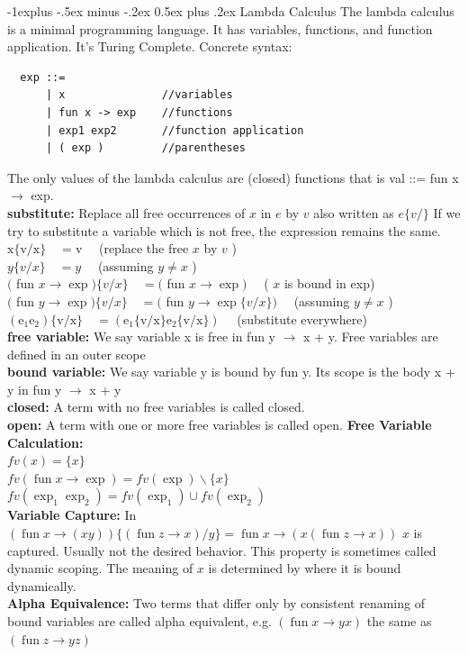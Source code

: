 \documentclass[10pt,landscape]{article}
\makeatletter
\renewcommand{\subsection}{\@startsection{subsection}{2}{0mm}%
                                {-1explus -.5ex minus -.2ex}%
                                {0.5ex plus .2ex}%
                                {\normalfont\normalsize\bfseries}}
\makeatother
\begin{document}
\begin{multicols}{3}
\subsection{Lambda Calculus}
The lambda calculus is a minimal programming language. It has variables, functions, and function application.
It's Turing Complete. Concrete syntax:
\begin{verbatim}
  exp ::=
      | x               //variables
      | fun x -> exp    //functions
      | exp1 exp2       //function application
      | ( exp )         //parentheses
\end{verbatim}
The only values of the lambda calculus are (closed) functions that is val ::= fun x $\rightarrow$ exp.\\
\textbf{substitute:} Replace all free occurrences of $x$ in $e$ by $v$ also written as $e\{v/\}$ If we try to substitute a
variable which is not free, the expression remains the same.\\
$\mathrm{x}\{\mathrm{v} / \mathrm{x}\} \quad=\mathrm{v} \quad$ (replace the free $x$ by $v$ )\\
$y\{v / x\} \quad=y \quad$ (assuming $y \neq x$ )\\
$($ fun $x\rightarrow\exp )\{v / x\} \quad=($ fun $x \rightarrow \exp ) \quad$ ( $x$ is bound in exp)\\
$($ fun $y\rightarrow\exp )\{v / x\} \quad=($ fun $y\rightarrow \exp \{v / x\}) \quad$ (assuming $y \neq x$ )\\
$\left(\mathrm{e}_1 \mathrm{e}_2\right)\{\mathrm{v} / \mathrm{x}\} \quad=\left(\mathrm{e}_1\{\mathrm{v} / \mathrm{x}\} \mathrm{e}_2\{\mathrm{v} / \mathrm{x}\}\right) \quad$ (substitute everywhere)\\
\textbf{free variable:} We say variable x is free in fun y $\rightarrow$ x + y. Free variables are defined in an outer scope\\
\textbf{bound variable:} We say variable y is bound by fun y. Its scope is the body x + y in fun y $\rightarrow$ x + y\\
\textbf{closed:} A term with no free variables is called closed. \\
\textbf{open:} A term with one or more free variables is called open.
\textbf{Free Variable Calculation:}\\
$fv(x) = \{x\}$ \\
$fv(\operatorname{fun} x \rightarrow \exp) = fv(\exp) \backslash \{x\}$ \\
$fv(\exp_1 \exp_2) = fv(\exp_1) \cup fv(\exp_2)$\\
\textbf{Variable Capture:} In $(\operatorname{fun} x \rightarrow (x y)) \{(\operatorname{fun} z \rightarrow x) / y\} = \operatorname{fun} x \rightarrow (x (\operatorname{fun} z \rightarrow x))$
$x$ is captured. Usually not the desired behavior. This property is sometimes called dynamic scoping. The meaning of $x$ is determined by where it is bound
dynamically. \\
\textbf{Alpha Equivalence:} Two terms that differ only by consistent renaming of bound variables are called alpha equivalent, e.g. $(\operatorname{fun} x \rightarrow y x)$ the same as $(\operatorname{fun} z \rightarrow y z)$\\

\end{multicols}
\end{document}

